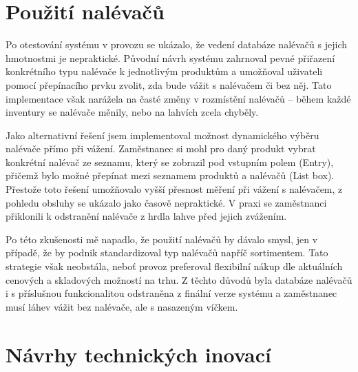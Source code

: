 \section{Použití nalévačů}
Po otestování systému v provozu se ukázalo, že vedení databáze nalévačů s jejich hmotnostmi je nepraktické. Původní návrh systému zahrnoval pevné přiřazení konkrétního typu nalévače k jednotlivým produktům a umožňoval uživateli pomocí přepínacího prvku zvolit, zda bude vážit s nalévačem či bez něj. Tato implementace však narážela na časté změny v rozmístění nalévačů – během každé inventury se nalévače měnily, nebo na lahvích zcela chyběly.

Jako alternativní řešení jsem implementoval možnost dynamického výběru nalévače přímo při vážení. Zaměstnanec si mohl pro daný produkt vybrat konkrétní nalévač ze seznamu, který se zobrazil pod vstupním polem (Entry), přičemž bylo možné přepínat mezi seznamem produktů a nalévačů (List box). Přestože toto řešení umožňovalo vyšší přesnost měření při vážení s nalévačem, z pohledu obsluhy se ukázalo jako časově nepraktické. V praxi se zaměstnanci přiklonili k odstranění nalévače z hrdla lahve před jejich zvážením.

Po této zkušenosti mě napadlo, že použití nalévačů by dávalo smysl, jen v případě, že by podnik standardizoval typ nalévačů napříč sortimentem. Tato strategie však neobstála, neboť provoz preferoval flexibilní nákup dle aktuálních cenových a skladových možností na trhu. Z těchto důvodů byla databáze nalévačů i s příslušnou funkcionalitou odstraněna z finální verze systému a zaměstnanec musí láhev vážit bez nalévače, ale s nasazeným víčkem.

\section{Návrhy technických inovací}

